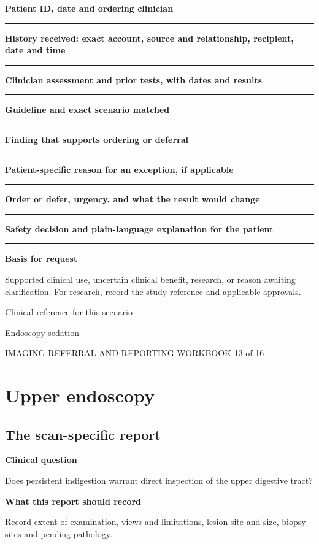 \documentclass[11pt,a4paper]{article}
\newcommand{\record}[1]{\textbf{#1}\par\vspace{0.55\baselineskip}\hrule\vspace{0.35\baselineskip}}
\begin{document}
\record{Patient ID, date and ordering clinician}

\record{History received: exact account, source and relationship, recipient, date and time}

\record{Clinician assessment and prior tests, with dates and results}

\record{Guideline and exact scenario matched}

\record{Finding that supports ordering or deferral}

\record{Patient-specific reason for an exception, if applicable}

\record{Order or defer, urgency, and what the result would change}

\record{Safety decision and plain-language explanation for the patient}

\textbf{Basis for request}\par Supported clinical use, uncertain clinical benefit, research, or reason awaiting clarification. For research, record the study reference and applicable approvals.\par

\small\href{https://gi.org/guideline/management-of-dyspepsia}{Clinical reference for this scenario}

\quad\href{https://pmc.ncbi.nlm.nih.gov/articles/PMC10850688/}{Endoscopy sedation}

\normalsize

\newpage

{\small IMAGING REFERRAL AND REPORTING WORKBOOK \hfill 13 of 16}

\section*{Upper endoscopy}

\subsection*{The scan-specific report}

\textbf{Clinical question}\par Does persistent indigestion warrant direct inspection of the upper digestive tract?\par

\textbf{What this report should record}\par Record extent of examination, views and limitations, lesion site and size, biopsy sites and pending pathology.\par
\end{document}
